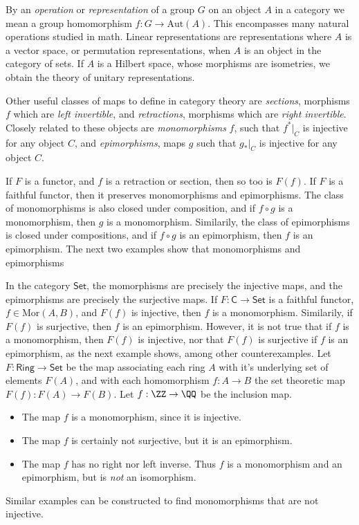 By an \emph{operation} or \emph{representation} of a group $G$ on an object $A$ in a category we mean a group homomorphism $f: G \to \text{Aut}(A)$. This encompasses many natural operations studied in math. Linear representations are representations where $A$ is a vector space, or permutation representations, when $A$ is an object in the category of sets. If $A$ is a Hilbert space, whose morphisms are isometries, we obtain the theory of unitary representations.

Other useful classes of maps to define in category theory are \emph{sections}, morphisms $f$ which are \emph{left invertible}, and \emph{retractions}, morphisms which are \emph{right invertible}. Closely related to these objects are \emph{monomorphisms} $f$, such that $f^*|_C$ is injective for any object $C$, and \emph{epimorphisms}, maps $g$ such that $g_*|_C$ is injective for any object $C$.

If $F$ is a functor, and $f$ is a retraction or section, then so too is $F(f)$. If $F$ is a faithful functor, then it preserves monomorphisms and epimorphisms. The class of monomorphisms is also closed under composition, and if $f \circ g$ is a monomorphism, then $g$ is a monomorphism. Similarily, the class of epimorphisms is closed under compositions, and if $f \circ g$ is an epimorphism, then $f$ is an epimorphism. The next two examples show that monomorphisms and epimorphisms

\begin{example}
    In the category $\mathsf{Set}$, the momorphisms are precisely the injective maps, and the epimorphisms are precisely the surjective maps. If $F: \mathsf{C} \to \mathsf{Set}$ is a faithful functor, $f \in \text{Mor}(A,B)$, and $F(f)$ is injective, then $f$ is a monomorphism. Similarily, if $F(f)$ is surjective, then $f$ is an epimorphism. However, it is not true that if $f$ is a monomorphism, then $F(f)$ is injective, nor that $F(f)$ is surjective if $f$ is an epimorphism, as the next example shows, among other counterexamples. Let $F: \mathsf{Ring} \to \mathsf{Set}$ be the map associating each ring $A$ with it's underlying set of elements $F(A)$, and with each homomorphism $f: A \to B$ the set theoretic map $F(f): F(A) \to F(B)$. Let $f: \ZZ \to \QQ$ be the inclusion map.
    \begin{itemize}
        \item The map $f$ is a monomorphism, since it is injective.
        \item The map $f$ is certainly not surjective, but it is an epimorphism.
        \item The map $f$ has no right nor left inverse. Thus $f$ is a monomorphism and an epimorphism, but is \emph{not} an isomorphism.
    \end{itemize}
    Similar examples can be constructed to find monomorphisms that are not injective.
\end{example}

